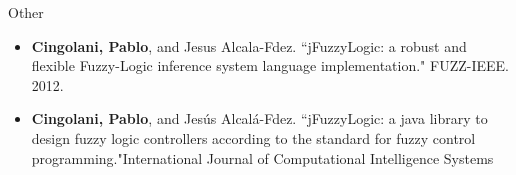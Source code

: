 \begin{description}
	\item Other 

	\begin{itemize}
		\item \textbf{Cingolani, Pablo}, and Jesus Alcala-Fdez. ``jFuzzyLogic: a robust and flexible Fuzzy-Logic inference system language implementation." FUZZ-IEEE. 2012.
		\item \textbf{Cingolani, Pablo}, and Jesús Alcalá-Fdez. ``jFuzzyLogic: a java library to design fuzzy logic controllers according to the standard for fuzzy control programming."International Journal of Computational Intelligence Systems 
	\end{itemize}	

\end{description}
